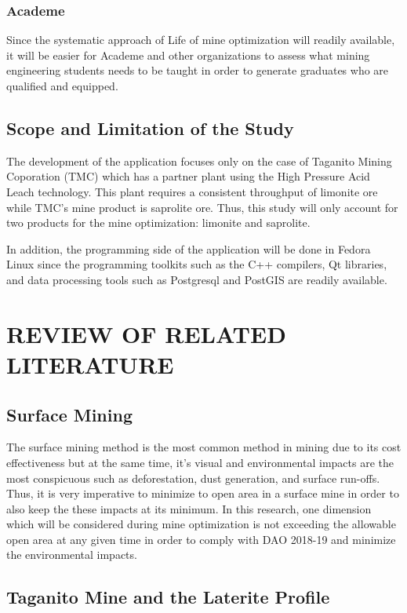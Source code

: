 \documentclass[12pt]{report}
\begin{document}
\subsection{Academe}

Since the systematic approach of Life of mine optimization will readily available, it will be easier for Academe and other organizations to assess what mining engineering students needs to be taught in order to generate graduates who are qualified and equipped.

\section{Scope and Limitation of the Study}

The development of the application focuses only on the case of Taganito Mining Coporation (TMC) which has a partner plant using the High Pressure Acid Leach technology.
This plant requires a consistent throughput of limonite ore while TMC's mine product is saprolite ore.
Thus, this study will only account for two products for the mine optimization: limonite and saprolite.

In addition, the programming side of the application will be done in Fedora Linux \cite{fedora} since the programming toolkits such as the C++ compilers, Qt libraries, and data processing tools such as Postgresql \cite{postgres} and PostGIS \cite{postgis} are readily available.

\chapter{REVIEW OF RELATED LITERATURE}

\section{Surface Mining}

The surface mining method is the most common method in mining due to its cost effectiveness but at the same time, it's visual and environmental impacts are the most conspicuous such as deforestation, dust generation, and surface run-offs.
Thus, it is very imperative to minimize to open area in a surface mine in order to also keep the these impacts at its minimum.
In this research, one dimension which will be considered during mine optimization is not exceeding the allowable open area at any given time in order to comply with DAO 2018-19 and minimize the environmental impacts.

\section{Taganito Mine and the Laterite Profile}
\end{document}
